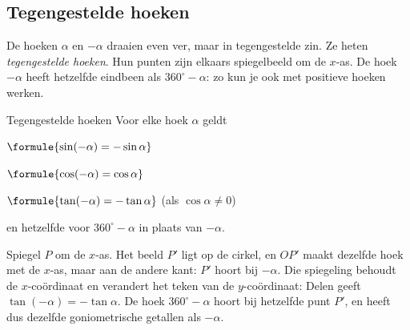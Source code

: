 \begin{oefeningen}
\end{oefeningen}

\subsection{Tegengestelde hoeken}

De hoeken $\alpha$ en $-\alpha$ draaien even ver, maar in tegengestelde zin. Ze heten \emph{tegengestelde hoeken}. Hun punten zijn elkaars spiegelbeeld om de $x$-as. De hoek $-\alpha$ heeft hetzelfde eindbeen als $360^\circ - \alpha$: zo kun je ook met positieve hoeken werken.

\begin{theorie}
\begin{minipage}[t]{.64\linewidth}
\vspace{0pt}
\begin{stelling}{Tegengestelde hoeken}
Voor elke hoek $\alpha$ geldt

\vspace{1mm}
\qquad $\formule{\sin(-\alpha) = -\sin\alpha}$

\qquad $\formule{\cos(-\alpha) = \cos\alpha}$

\qquad $\formule{\tan(-\alpha) = -\tan\alpha}$ \quad (als $\cos\alpha \neq 0$)

\vspace{1mm}
en hetzelfde voor $360^\circ - \alpha$ in plaats van $-\alpha$.
\end{stelling}

\begin{bewijs}
Spiegel $P$ om de $x$-as. Het beeld $P'$ ligt op de cirkel, en $OP'$ maakt dezelfde hoek met de $x$-as, maar aan de andere kant: $P'$ hoort bij $-\alpha$. Die spiegeling behoudt de $x$-coördinaat en verandert het teken van de $y$-coördinaat:
Delen geeft $\tan(-\alpha) = -\tan\alpha$. De hoek $360^\circ - \alpha$ hoort bij hetzelfde punt $P'$, en heeft dus dezelfde goniometrische getallen als $-\alpha$.
\end{bewijs}
\end{minipage}\hfill
\begin{minipage}[t]{.32\linewidth}
\vspace{3mm}
\centering
{}
\end{minipage}
\end{theorie}

